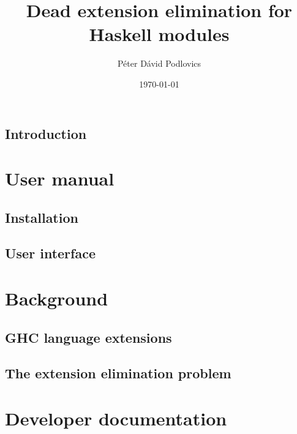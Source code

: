 \documentclass[12pt,a4paper,twoside]{report}
\title{Dead extension elimination for Haskell modules}
\date{\today}
\author{Péter Dávid Podlovics}
\begin{document}
	
	
	
	\setcounter{tocdepth}{0}
	\begin{spacing}{0.1}
		\tableofcontents
	\end{spacing}
	
	\chapter{Introduction}
	
	
	\part*{User manual}
		\chapter{Installation}
		
		
		\chapter{User interface}
		
	
	\part*{Background} \label{background}
		\chapter{GHC language extensions} \label{ghc-exts}
		
		
		\chapter{The extension elimination problem}
		
		
	\part*{Developer documentation}
\end{document}
